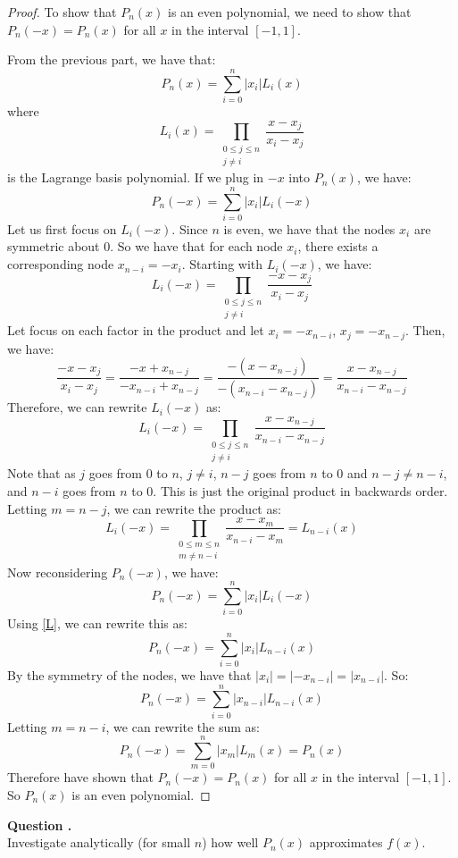 \documentclass[12pt]{article}
\newcounter{question}
\newcounter{subquest}
\newcommand{\subquestion}{
    \stepcounter{subquest} 
    \vspace{.5em}
    \textbf{\large Question \thequestion.\thesubquest}
    \vspace{.25em}\ \\}
\begin{document}
\begin{proof}
    To show that $P_n(x)$ is an even polynomial, we need to show that $P_n(-x) = P_n(x)$ for all $x$ in the interval $[-1, 1]$.

    From the previous part, we have that:
    \[P_n(x) = \sum_{i=0}^{n} |x_i| L_i(x)\]
    where
    \[L_i(x) = \prod_{\substack{0 \leq j \leq n \\ j \neq i}} \frac{x - x_j}{x_i - x_j}\]
    is the Lagrange basis polynomial. If we plug in $-x$ into $P_n(x)$, we have:
    \[P_n(-x) = \sum_{i=0}^{n} |x_i| L_i(-x)\]
    Let us first focus on $L_i(-x)$.
    Since $n$ is even, we have that the nodes $x_i$ are symmetric about $0$. So we have that for each node $x_i$, there exists a corresponding node $x_{n-i} = -x_i$. Starting with $L_i(-x)$, we have:
    \[L_i(-x) = \prod_{\substack{0 \leq j \leq n \\ j \neq i}} \frac{-x - x_j}{x_i - x_j}\]
    Let focus on each factor in the product and let $x_i = -x_{n-i}$, $x_j = -x_{n-j}$. Then, we have:
    \[\frac{-x - x_j}{x_i - x_j} = \frac{-x + x_{n-j}}{-x_{n-i} + x_{n-j}} = \frac{-(x - x_{n-j})}{-(x_{n-i} - x_{n-j})} = \frac{x - x_{n-j}}{x_{n-i} - x_{n-j}}\]
    Therefore, we can rewrite $L_i(-x)$ as:
    \[L_i(-x) = \prod_{\substack{0 \leq j \leq n \\ j \neq i}} \frac{x - x_{n-j}}{x_{n-i} - x_{n-j}}\]
    Note that as $j$ goes from $0$ to $n$, $j \neq i$, $n-j$ goes from $n$ to $0$ and $n-j \neq n-i$, and $n-i$ goes from $n$ to $0$. This is just the original product in backwards order. Letting $m = n-j$, we can rewrite the product as:
    \[L_i(-x) = \prod_{\substack{0 \leq m \leq n \\ m \neq n-i}} \frac{x - x_{m}}{x_{n-i} - x_{m}} = L_{n-i}(x) \label{L}\tag{1}\]
    Now reconsidering $P_n(-x)$, we have:
    \[P_n(-x) = \sum_{i=0}^{n} |x_i| L_i(-x)\]
    Using \eqref{L}, we can rewrite this as:
    \[P_n(-x) = \sum_{i=0}^{n} |x_i| L_{n-i}(x)\]
    By the symmetry of the nodes, we have that $|x_i| = |-x_{n-i}| = |x_{n-i}|$. So:
    \[P_n(-x) = \sum_{i=0}^{n} |x_{n-i}| L_{n-i}(x)\]
    Letting $m = n-i$, we can rewrite the sum as:
    \[P_n(-x) = \sum_{m=0}^{n} |x_{m}| L_{m}(x) = P_n(x)\]
    Therefore have shown that $P_n(-x) = P_n(x)$ for all $x$ in the interval $[-1, 1]$. So $P_n(x)$ is an even polynomial.
\end{proof}

\newpage

\subquestion
Investigate analytically (for small $n$) how well $P_n(x)$ approximates $f(x)$.
\end{document}

